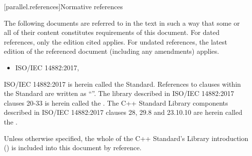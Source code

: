 
[parallel.references]{Normative references}

\pnum
The following documents are referred to in the text in such a way that some or all of their content constitutes
requirements of this document. For dated references, only the
edition cited applies. For undated references, the latest edition
of the referenced document (including any amendments) applies.

\begin{itemize}
\item ISO/IEC 14882:2017,
\end{itemize}

\pnum
ISO/IEC 14882:2017 is herein called the \Cpp Standard.
References to clauses within the \Cpp Standard are written as ``''.
The library described in ISO/IEC 14882:2017 clauses 20-33 is herein called the .
The C++ Standard Library components described in ISO/IEC 14882:2017 clauses 28, 29.8 and 23.10.10 are herein called the .

\pnum
Unless otherwise specified, the whole of the C++ Standard's Library introduction () is included into this document by reference.
